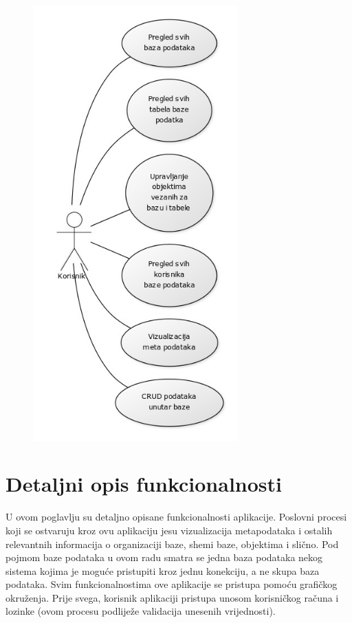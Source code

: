 \documentclass[12pt, a4paper]{report}
\theoremstyle{definition}
\begin{document}
\begin{figure}
		\begin{center} 
			\includegraphics[width=0.7\textwidth]{usecase.jpg}
		\end{center}
\end{figure}




\chapter{Detaljni opis funkcionalnosti}


U ovom poglavlju su detaljno opisane funkcionalnosti aplikacije. Poslovni procesi koji se ostvaruju kroz ovu aplikaciju jesu vizualizacija metapodataka i ostalih relevantnih informacija o organizaciji baze, shemi baze, objektima i slično. Pod pojmom baze podataka u ovom radu smatra se jedna baza podataka nekog sistema kojima je moguće pristupiti kroz jednu konekciju, a ne skupa baza podataka. Svim funkcionalnostima ove aplikacije se pristupa  pomoću grafičkog okruženja. Prije svega, korisnik aplikaciji pristupa unosom korisničkog računa i lozinke (ovom procesu podliježe validacija unesenih vrijednosti). 
\end{document}

